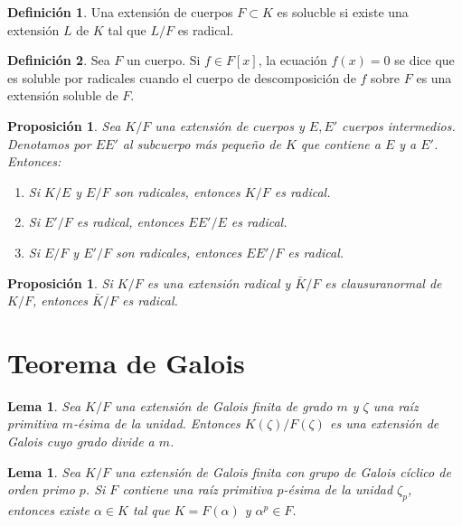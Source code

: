 \documentclass{report}
\newtheorem{lemma}[theorem]{Lema}
\newtheorem{proposition}[theorem]{Proposición}
\theoremstyle{remark}
\theoremstyle{definition}
\newtheorem{definition}{Definición}[chapter]
\theoremstyle{definition}
\theoremstyle{definition}
\begin{document}
\begin{definition}
    Una extensión de cuerpos $F \subset K$ es solucble si existe una extensión $L$ de $K$ tal que $L/F$ es radical.
\end{definition}

\begin{definition}
    Sea $F$ un cuerpo. Si $f \in F[x]$, la ecuación $f(x) = 0$ se dice que es soluble por radicales cuando el cuerpo de descomposición de $f$ sobre $F$ es una extensión soluble de $F$.
\end{definition}

\begin{proposition}
    Sea $K/F$ una extensión de cuerpos y $E, E'$ cuerpos intermedios. Denotamos por $EE'$ al subcuerpo más pequeño de $K$ que contiene a $E$ y a $E'$. Entonces:
    \begin{enumerate}
        \item Si $K/E$ y $E/F$ son radicales, entonces $K/F$ es radical.
        \item Si $E'/F$ es radical, entonces $EE'/E$ es radical.
        \item Si $E/F$ y $E'/F$ son radicales, entonces $EE'/F$ es radical.
    \end{enumerate}
\end{proposition}

\begin{proposition}
    Si $K/F$ es una extensión radical y $\bar{K}/F$ es clausuranormal de $K/F$, entonces $\bar{K}/F$ es radical.
\end{proposition}

\section{Teorema de Galois}

\begin{lemma}
    Sea $K/F$ una extensión de Galois finita de grado $m$ y $\zeta$ una raíz primitiva $m$-ésima de la unidad.
    Entonces $K(\zeta)/F(\zeta)$ es una extensión de Galois cuyo grado divide a $m$.
\end{lemma}

\begin{lemma}
    Sea $K/F$ una extensión de Galois finita con grupo de Galois cíclico de orden primo $p$.
    Si $F$ contiene una raíz primitiva $p$-ésima de la unidad $\zeta_p$, entonces existe $\alpha \in K$ tal que $K = F(\alpha)$ y $\alpha^p \in F$.
\end{lemma}
\end{document}
